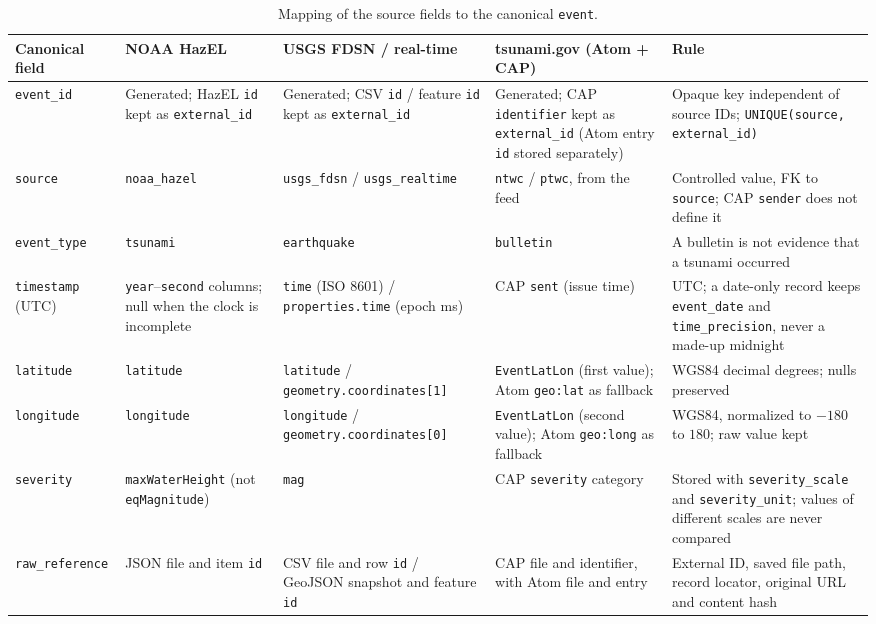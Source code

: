 \documentclass[a4paper,11pt,oneside]{book}
\begin{document}
\begin{table}[H]
\centering
\footnotesize
\begin{tabularx}{\textwidth}{@{}>{\raggedright\arraybackslash}p{1.7cm}>{\raggedright\arraybackslash}X>{\raggedright\arraybackslash}X>{\raggedright\arraybackslash}X>{\raggedright\arraybackslash}X@{}}
\toprule
Canonical field & NOAA HazEL & USGS FDSN / real-time & tsunami.gov (Atom + CAP) & Rule \\
\midrule
\texttt{event\_id} & Generated; HazEL \texttt{id} kept as \texttt{external\_id} & Generated; CSV \texttt{id} / feature \texttt{id} kept as \texttt{external\_id} & Generated; CAP \texttt{identifier} kept as \texttt{external\_id} (Atom entry \texttt{id} stored separately) & Opaque key independent of source IDs; \texttt{UNIQUE(source,\allowbreak{} external\_id)} \\
\texttt{source} & \texttt{noaa\_hazel} & \texttt{usgs\_fdsn} / \texttt{usgs\_realtime} & \texttt{ntwc} / \texttt{ptwc}, from the feed & Controlled value, FK to \texttt{source}; CAP \texttt{sender} does not define it \\
\texttt{event\_type} & \texttt{tsunami} & \texttt{earthquake} & \texttt{bulletin} & A bulletin is not evidence that a tsunami occurred \\
\texttt{timestamp} (UTC) & \texttt{year}--\texttt{second} columns; null when the clock is incomplete & \texttt{time} (ISO 8601) / \texttt{properties.\allowbreak time} (epoch ms) & CAP \texttt{sent} (issue time) & UTC; a date-only record keeps \texttt{event\_date} and \texttt{time\_precision}, never a made-up midnight \\
\texttt{latitude} & \texttt{latitude} & \texttt{latitude} / \texttt{geometry.\allowbreak coordinates[1]} & \texttt{EventLatLon} (first value); Atom \texttt{geo:lat} as fallback & WGS84 decimal degrees; nulls preserved \\
\texttt{longitude} & \texttt{longitude} & \texttt{longitude} / \texttt{geometry.\allowbreak coordinates[0]} & \texttt{EventLatLon} (second value); Atom \texttt{geo:long} as fallback & WGS84, normalized to $-180$ to $180$; raw value kept \\
\texttt{severity} & \texttt{maxWaterHeight} (not \texttt{eqMagnitude}) & \texttt{mag} & CAP \texttt{severity} category & Stored with \texttt{severity\_scale} and \texttt{severity\_unit}; values of different scales are never compared \\
\texttt{raw\_\allowbreak reference} & JSON file and item \texttt{id} & CSV file and row \texttt{id} / GeoJSON snapshot and feature \texttt{id} & CAP file and identifier, with Atom file and entry & External ID, saved file path, record locator, original URL and content hash \\
\bottomrule
\end{tabularx}
\caption{Mapping of the source fields to the canonical \texttt{event}.}
\label{tab:mapping}
\end{table}
\end{document}
